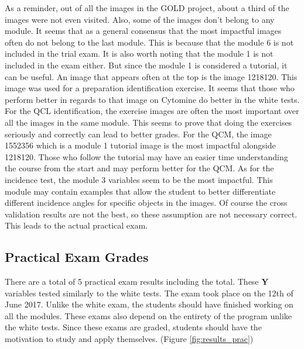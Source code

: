 \documentclass[a4paper,11pt]{report}
\numberwithin{figure}{chapter} %
\begin{document}
    As a reminder, out of all the images in the GOLD project, about a third of the images were not even visited.
    Also, some of the images don't belong to any module.
    It seems that as a general consensus that the most impactful images often do not belong to the last module.
    This is because that the module 6 is not included in the trial exam.
    It is also worth noting that the module 1 is not included in the exam either.
    But since the module 1 is considered a tutorial, it can be useful.
    An image that appears often at the top is the image 1218120.
    This image was used for a preparation identification exercise.
    It seems that those who perform better in regards to that image on Cytomine do better in the white tests.
    For the QCL identification, the exercise images are often the most important over all the images in the same module.
    This seems to prove that doing the exercises seriously and correctly can lead to better grades.
    For the QCM, the image 1552356 which is a module 1 tutorial image is the most impactful alongside 1218120.
    Those who follow the tutorial may have an easier time understanding the course from the start and may perform better for the QCM. As for the incidence test, the module 3 variables seem to be the most impactful.
    This module may contain examples that allow the student to better differentiate different incidence angles for specific objects in the images.
    Of course the cross validation results are not the best, so these assumption are not necessary correct. This leads to the actual practical exam.

    \subsection{Practical Exam Grades}

	There are a total of 5 practical exam results including the total.
	These \textbf{Y} variables tested similarly to the white tests.
	The exam took place on the 12th of June 2017.
	Unlike the white exam, the students should have finished working on all the modules.
	These exams also depend on the entirety of the program unlike
the white tests.
Since these exams are graded, students should have the motivation to study and apply themselves. (Figure \ref{fig:results_prac})
\end{document}

